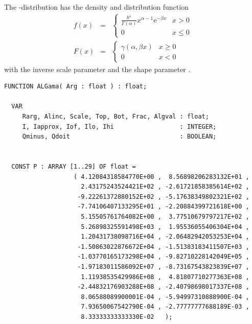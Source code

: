 \begin{refsection}
The \textGamma-distribution  has the density and distribution function
\begin{eqnarray}
  f(x) &=& \left\{
             \begin{array}{lr}
                \frac{b^\alpha}{\Gamma(\alpha)} x^{\alpha-1} \mathrm{e}^{-\beta x} & x > 0 \\
                0                                                                  & x \leq 0
             \end{array}
           \right.  \\
  F(x) &=& \left\{
              \begin{array}{lr}
                 \gamma(\alpha, \beta x)  & x \geq 0  \\
                 0                        & x < 0
              \end{array}
           \right.
\end{eqnarray}
with the inverse scale parameter  and the shape parameter .

\begin{lstlisting}[caption=\textgamma distribution]
  FUNCTION ALGama( Arg : float ) : float;

  VAR
     Rarg, Alinc, Scale, Top, Bot, Frac, Algval : float;
     I, Iapprox, Iof, Ilo, Ihi                  : INTEGER;
     Qminus, Qdoit                              : BOOLEAN;


  CONST P : ARRAY [1..29] OF float =
                   ( 4.12084318584770E+00 ,  8.56898206283132E+01 ,
                     2.43175243524421E+02 , -2.61721858385614E+02 ,
                    -9.22261372880152E+02 , -5.17638349802321E+02 ,
                    -7.74106407133295E+01 , -2.20884399721618E+00 ,
                     5.15505761764082E+00 ,  3.77510679797217E+02 ,
                     5.26898325591498E+03 ,  1.95536055406304E+04 ,
                     1.20431738098716E+04 , -2.06482942053253E+04 ,
                    -1.50863022876672E+04 , -1.51383183411507E+03 ,
                    -1.03770165173298E+04 , -9.82710228142049E+05 ,
                    -1.97183011586092E+07 , -8.73167543823839E+07 ,
                     1.11938535429986E+08 ,  4.81807710277363E+08 ,
                    -2.44832176903288E+08 , -2.40798698017337E+08 ,
                     8.06588089900001E-04 , -5.94997310888900E-04 ,
                     7.93650067542790E-04 , -2.77777777688189E-03 ,
                     8.33333333333330E-02   );


\end{lstlisting}
\end{refsection}
